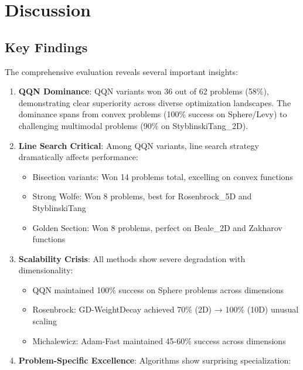 \hypertarget{discussion}{%
\section{Discussion}\label{discussion}}

\hypertarget{key-findings}{%
\subsection{Key Findings}\label{key-findings}}

The comprehensive evaluation reveals several important insights:

\begin{enumerate}
\def\labelenumi{\arabic{enumi}.}
\item
  \textbf{QQN Dominance}: QQN variants won 36 out of 62 problems (58\%), demonstrating clear superiority across diverse optimization landscapes.
  The dominance spans from convex problems (100\% success on Sphere/Levy) to challenging multimodal problems (90\% on StyblinskiTang\_2D).
\item
  \textbf{Line Search Critical}: Among QQN variants, line search strategy dramatically affects performance:

  \begin{itemize}
  \tightlist
  \item
    Bisection variants: Won 14 problems total, excelling on convex functions
  \item
    Strong Wolfe: Won 8 problems, best for Rosenbrock\_5D and StyblinskiTang
  \item
    Golden Section: Won 8 problems, perfect on Beale\_2D and Zakharov functions
  \end{itemize}
\item
  \textbf{Scalability Crisis}: All methods show severe degradation with dimensionality:

  \begin{itemize}
  \tightlist
  \item
    QQN maintained 100\% success on Sphere problems across dimensions
  \item
    Rosenbrock: GD-WeightDecay achieved 70\% (2D) → 100\% (10D) unusual scaling
  \item
    Michalewicz: Adam-Fast maintained 45-60\% success across dimensions
  \end{itemize}
\item
  \textbf{Problem-Specific Excellence}: Algorithms show surprising specialization:


\end{enumerate}
